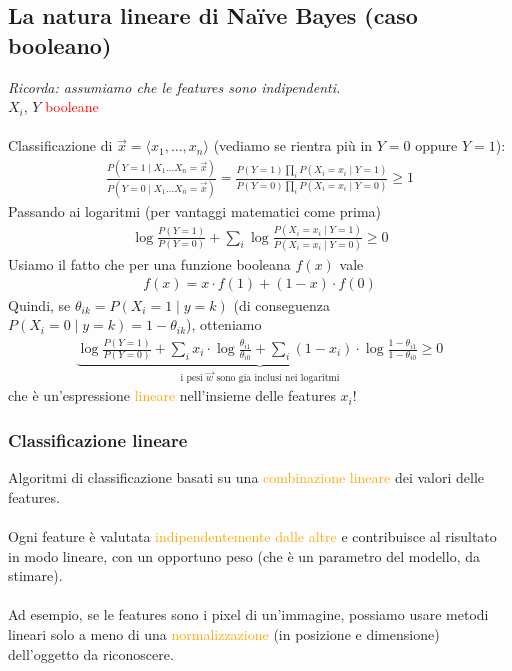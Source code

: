 \documentclass[a4paper,12pt]{article}
\newcommand{\hl}[1]{\textcolor{orange}{#1}}
\begin{document}
\subsection{La natura lineare di Naïve Bayes (caso booleano)}
\textit{Ricorda: assumiamo che le features sono indipendenti.}\\
$X_i$, $Y$ \textcolor{red}{booleane}\\
\vspace{1px}\\
Classificazione di $\vec{x}=\langle x_1,\dots,x_n\rangle$ (vediamo se rientra più in $Y=0$ oppure $Y=1$):
\begin{align*}
    \frac{P(Y=1\mid X_1\dots X_n=\vec{x})}{P(Y=0\mid X_1\dots X_n=\vec{x})} = \frac{P(Y=1)\prod_i P(X_i=x_i\mid Y=1)}{P(Y=0)\prod_i P(X_i=x_i\mid Y=0)} \geq 1
\end{align*}
Passando ai logaritmi (per vantaggi matematici come prima)
\begin{align*}
    \log\frac{P(Y=1)}{P(Y=0)} + \sum_i \log\frac{P(X_i=x_i\mid Y=1)}{P(X_i=x_i\mid Y=0)} \geq 0
\end{align*}
Usiamo il fatto che per una funzione booleana $f(x)$ vale
\begin{align*}
    f(x) = x\cdot f(1) + (1-x)\cdot f(0)
\end{align*}
Quindi, se $\theta_{ik}=P(X_i=1\mid y=k)$ (di conseguenza $P(X_i=0\mid y=k)=1-\theta_{ik}$), otteniamo
\begin{align*}
    \underbrace{\log\frac{P(Y=1)}{P(Y=0)} + \sum_i x_i\cdot\log\frac{\theta_{i1}}{\theta_{i0}} + \sum_i (1-x_i)\cdot\log\frac{1-\theta_{i1}}{1-\theta_{i0}} \geq 0}_\text{i pesi $\vec{w}$ sono gia inclusi nei logaritmi}
\end{align*}
che è un'espressione \hl{lineare} nell'insieme delle features $x_i$!
\subsubsection{Classificazione lineare}
Algoritmi di classificazione basati su una \hl{combinazione lineare} dei valori delle features.\\
\vspace{1px}\\
Ogni feature è valutata \hl{indipendentemente dalle altre} e contribuisce al risultato in modo lineare, con un opportuno peso (che è un parametro del modello, da stimare).\\
\vspace{1px}\\
Ad esempio, se le features sono i pixel di un'immagine, possiamo usare metodi lineari solo a meno di una \hl{normalizzazione} (in posizione e dimensione) dell'oggetto da riconoscere.
\end{document}
